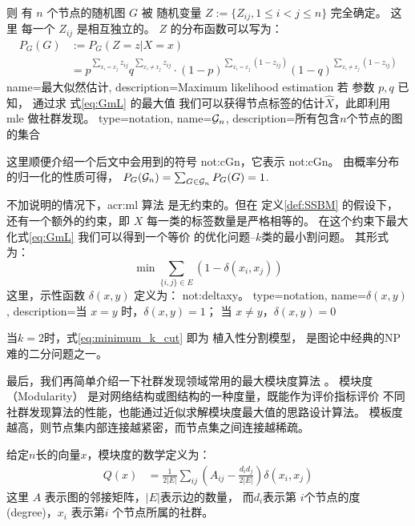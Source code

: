 则 有 $n$ 个节点的随机图 $G$ 
被 
随机变量 $Z:=\{Z_{ij}, 1\leq i<j\leq n\}$ 完全确定。
这里 每一个 $Z_{ij}$ 是相互独立的。
$Z$ 的分布函数可以写为：
\begin{align}\label{eq:mle_sibm}
P_G(G)&:=P_G(Z = z| X=x) \\
&= p^{\sum_{x_i = x_j}
z_{ij}}q^{\sum_{x_i \neq x_j} z_{ij}} 
\cdot (1-p)^{\sum_{x_i = x_j} (1-z_{ij})}
(1-q)^{\sum_{x_i \neq x_j} (1-z_{ij})}
\label{eq:GmL}
\end{align}
{name=最大似然估计,
description={Maximum likelihood estimation}}
若 参数 $p, q$ 已知，
通过求
式\eqref{eq:GmL} 的最大值
我们可以获得节点标签的估计$\hat{X}$，此即利用
\gls{mle}
做社群发现。
{
  type=notation,
  name={$\mathcal{G}_n$},
  description={所有包含$n$个节点的图的集合}
}

这里顺便介绍一个后文中会用到的符号 \gls{not:cGn}，它表示
\glsdesc{not:cGn}。
由概率分布的归一化的性质可得，
$P_G(\mathcal{G}_n) = \sum_{G\in \mathcal{G}_n}P_G(G)=1$.

不加说明的情况下，\gls{acr:ml} 算法 是无约束的。但在
定义\ref{def:SSBM} 的假设下，
还有一个额外的约束，即 $X$ 每一类的标签数量是严格相等的。
在这个约束下最大化式\eqref{eq:GmL} 我们可以得到一个等价
的优化问题--$k$类的最小割问题。
其形式为：
\begin{equation}\label{eq:minimum_k_cut}
  \min \sum_{ \{i,j\} \in E} (1-\delta(x_i, x_j))
\end{equation}
这里，示性函数 $\delta(x,y)$ 定义为：
\glsdesc{not:deltaxy}。
{
  type=notation,
  name={$\delta(x,y)$},
  description={当 $x=y$ 时，$\delta(x,y) = 1$； 当 $x\neq y$，$\delta(x,y)=0$}
}

当$k=2$时，式\eqref{eq:minimum_k_cut} 即为 植入性分割模型，
是图论中经典的NP难的二分问题之一。

最后，我们再简单介绍一下社群发现领域常用的最大模块度算法
\cite{newman2006modularity}。
模块度（Modularity）
是对网络结构或图结构的一种度量，既能作为评价指标评价
不同社群发现算法的性能，也能通过近似求解模块度最大值的思路设计算法。
模板度越高，则节点集内部连接越紧密，而节点集之间连接越稀疏。

给定$n$长的向量$x$，模块度的数学定义为：
\begin{align}\label{eq:Q}
  Q(x) &= \frac{1}{2 |E|} \sum_{ij} (A_{ij} - \frac{d_i d_j}{2 |E|}) \delta(x_i, x_j)
\end{align}
这里 $A$ 表示图的邻接矩阵，$|E|$表示边的数量，
而$d_i$表示第
$i$个节点的度(degree)，$x_i$ 表示第$i$
个节点所属的社群。

